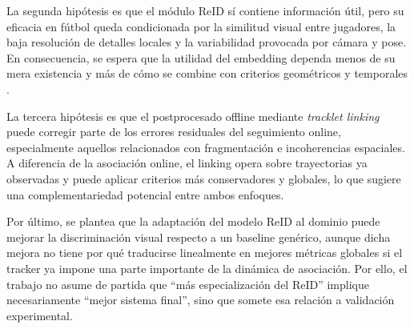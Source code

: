 \documentclass[../MAIN.tex]{subfiles}
\begin{document}
La segunda hipótesis es que el módulo ReID sí contiene información útil, pero su eficacia en fútbol queda condicionada por la similitud visual entre jugadores, la baja resolución de detalles locales y la variabilidad provocada por cámara y pose. En consecuencia, se espera que la utilidad del embedding dependa menos de su mera existencia y más de cómo se combine con criterios geométricos y temporales \parencite{wojke2017deepsort,cui2023sportsmot}.

La tercera hipótesis es que el postprocesado offline mediante \textit{tracklet linking} puede corregir parte de los errores residuales del seguimiento online, especialmente aquellos relacionados con fragmentación e incoherencias espaciales. A diferencia de la asociación online, el linking opera sobre trayectorias ya observadas y puede aplicar criterios más conservadores y globales, lo que sugiere una complementariedad potencial entre ambos enfoques.

Por último, se plantea que la adaptación del modelo ReID al dominio puede mejorar la discriminación visual respecto a un baseline genérico, aunque dicha mejora no tiene por qué traducirse linealmente en mejores métricas globales si el tracker ya impone una parte importante de la dinámica de asociación. Por ello, el trabajo no asume de partida que “más especialización del ReID” implique necesariamente “mejor sistema final”, sino que somete esa relación a validación experimental.

\newpage
\end{document}
